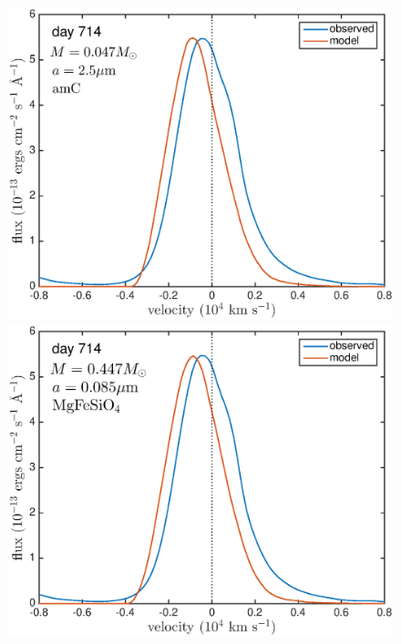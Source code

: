 \documentclass[useAMS,usenatbib,usegraphicx]{mnras}
\begin{document}
\begin{figure}
\includegraphics[trim =24 20 0 0,clip=true,scale=0.26]{silicates_take2/AmC_Dwek_Ha}
\includegraphics[trim =24 20 0 0,clip=true,scale=0.26]{silicates_take2/MgFeSiO4_Dwek_Ha}


\end{figure}
\end{document}
